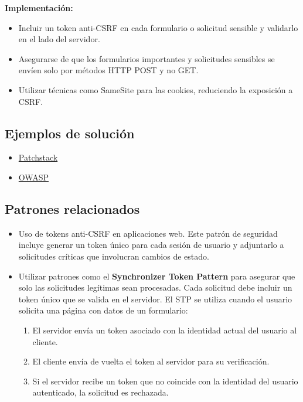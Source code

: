 \textbf{Implementación:} \begin{itemize} \item Incluir un token anti-CSRF en cada formulario o solicitud sensible y validarlo en el lado del servidor. \item Asegurarse de que los formularios importantes y solicitudes sensibles se envíen solo por métodos HTTP POST y no GET. \item Utilizar técnicas como SameSite para las cookies, reduciendo la exposición a CSRF. \end{itemize}

\subsection*{Ejemplos de solución}

\begin{itemize}
    \item \href{https://patchstack.com/academy/wordpress/securing-code/cross-site-request-forgery/}{Patchstack}
    \item \href{https://cheatsheetseries.owasp.org/cheatsheets/Cross-Site_Request_Forgery_Prevention_Cheat_Sheet.html}{OWASP}
\end{itemize}

\subsection*{Patrones relacionados}

\begin{itemize}
    \item Uso de tokens anti-CSRF en aplicaciones web. Este patrón de seguridad incluye generar un token único para cada sesión de usuario y adjuntarlo a solicitudes críticas que involucran cambios de estado.
    \item Utilizar patrones como el \textbf{Synchronizer Token Pattern} para asegurar que solo las solicitudes legítimas sean procesadas. Cada solicitud debe incluir un token único que se valida en el servidor. El STP se utiliza cuando el usuario solicita una página con datos de un formulario:
    \begin{enumerate}
        \item El servidor envía un token asociado con la identidad actual del usuario al cliente.
        \item El cliente envía de vuelta el token al servidor para su verificación.
        \item Si el servidor recibe un token que no coincide con la identidad del usuario autenticado, la solicitud es rechazada.
    \end{enumerate}
\end{itemize}


